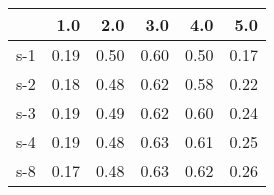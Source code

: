 \begin{tabular}{lrrrrr}
\toprule
{} &  1.0 &  2.0 &  3.0 &  4.0 &  5.0 \\
\midrule
s-1 & 0.19 & 0.50 & 0.60 & 0.50 & 0.17 \\
s-2 & 0.18 & 0.48 & 0.62 & 0.58 & 0.22 \\
s-3 & 0.19 & 0.49 & 0.62 & 0.60 & 0.24 \\
s-4 & 0.19 & 0.48 & 0.63 & 0.61 & 0.25 \\
s-8 & 0.17 & 0.48 & 0.63 & 0.62 & 0.26 \\
\bottomrule
\end{tabular}

